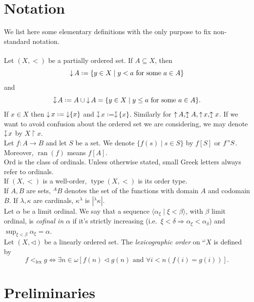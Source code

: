 \documentclass[11pt,a4paper]{report}
\theoremstyle{definition}
\theoremstyle{num.custom-title}
\theoremstyle{custom-title}
\DeclareMathOperator{\ran}{ran}
\DeclareMathOperator{\imp}{\Rightarrow}
\DeclareMathOperator{\sse}{\subseteq}
\DeclareMathOperator{\type}{type}
\DeclareMathOperator{\restr}{\upharpoonright}
\DeclareMathOperator{\down}{\downarrow}
\DeclareMathOperator{\up}{\uparrow}
\newcommand{\Ord}{\mathrm{Ord}}
\newcommand{\downmapsto}{%
           \mathrel{\raisebox{.1em}{%
							\rotatebox[origin=c]{-90}{$\mapsto$}}}}
\newcommand{\upmapsto}{%
           \mathrel{\raisebox{.08em}{%
							\rotatebox[origin=c]{90}{$\mapsto$}}}}
\newcommand*{\defeq}{\mathrel{\rlap{%
                     \raisebox{0.3ex}{$\cdot$}}%
                     \raisebox{-0.3ex}{$\cdot$}}%
                     =}
\renewcommand{\iff}{\Leftrightarrow}
\begin{document}
\chapter*{Notation}


We list here some elementary definitions with the only purpose to fix non-standard notation.\\
\\
Let $(X,<)$ be a partially ordered set. If $A \sse X$, then 
\[
\down A \defeq \{y \in X \mid y < a \text{ for some } a \in A \}
\]
and 
\[
\downmapsto A \defeq A \cup \down A = \{y \in X \mid y \leq a \text{ for some } a \in A \}.
\]
If $x \in X$ then $\down x \defeq \down \{x\}$ and $\downmapsto x \defeq \downmapsto \{x\}$. Similarly for $\up A, \upmapsto A, \up x, \upmapsto x$. If we want to avoid confusion about the ordered set we are considering, we may denote $\downmapsto x$ by $X \restr x$.\\
Let $f \colon A \to B$ and let $S$ be a set. We denote $\{f(s) \mid s \in S\}$ by $f[S]$ or $f"S$. Moreover, $\ran(f)$ means $f[A]$.\\
$\Ord$ is the class of ordinals. Unless otherwise stated, small Greek letters always refer to ordinals.\\
If $(X,<)$ is a well-order, $\type (X,<)$ is its order type.\\
If $A,B$ are sets, ${}^A B$ denotes the set of the functions with domain $A$ and codomain $B$. If $\lambda, \kappa$ are cardinals, $\kappa^\lambda$ is $|{}^\lambda \kappa|$.\\
Let $\alpha$ be a limit ordinal. We say that a sequence $\langle \alpha_\xi \mid \xi < \beta \rangle$, with $\beta$ limit ordinal, is \emph{cofinal in $\alpha$} if it's strictly increasing (i.e.\ $\xi < \delta \imp \alpha_\xi < \alpha_\delta$) and $\sup_{\xi < \beta} \alpha_\xi = \alpha$.\\
Let $(X,\lhd)$ be a linearly ordered set. The \emph{lexicographic order} on $^{\omega} X$ is defined by
\[
f <_{\text{lex}} g \iff \exists n \in \omega [f(n) \lhd g(n) \text{ and } \forall i < n (f(i)=g(i))].
\]




\chapter*{Preliminaries}
\end{document}
